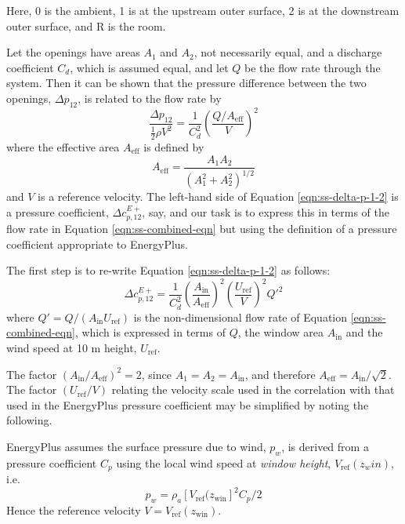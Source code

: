 Here, 0 is the  ambient, 1 is at the upstream outer surface, 2 is at the downstream outer surface, and R is the room.

Let the openings have areas $A_1$ and $A_2$, not necessarily equal, and a discharge coefficient $C_d$, which is assumed equal, and let $Q$ be the flow rate through the system. Then it can be shown that the pressure difference between the two openings, $\Delta p_{12}$, is related to the flow rate by
\begin{equation}\label{eqn:ss-delta-p-1-2}
\frac{\Delta p_{12}}{\frac{1}{2}\rho V^2} = \frac{1}{C_d^2}\left(\frac{Q/A_\text{eff}}{V}\right)^2
\end{equation}
where the effective area $A_\text{eff}$ is defined by
\begin{equation}
A_\text{eff}=\frac{A_1 A_2}{\left(A_1^2+A_2^2\right)^{1/2}}
\end{equation}
and $V$ is a reference velocity. The left-hand side of Equation \ref{eqn:ss-delta-p-1-2} is a pressure coefficient, $\Delta c_{p,12}^{E+}$, say, and our task is to express this in terms of the flow rate in Equation \ref{eqn:ss-combined-eqn} but using the definition of a pressure coefficient appropriate to EnergyPlus.

The first step is to re-write Equation \ref{eqn:ss-delta-p-1-2} as follows:
\begin{equation}
\Delta c_{p,12}^{E+} = \frac{1}{C_d^2}  \left(\frac{A_\text{in}}{A_\text{eff}}\right)^2 \left(\frac{U_\text{ref}}{V}\right)^2 Q'^2
\end{equation}
where $Q' = Q/(A_\text{in}U_\text{ref})$ is the non-dimensional flow rate of Equation \ref{eqn:ss-combined-eqn}, which is expressed in terms of $Q$, the window area $A_\text{in}$ and the wind speed at 10 m height, $U_\text{ref}$.

The factor $\left(A_\text{in}/A_\text{eff}\right)^2 = 2$, since $A_1 = A_2 = A_\text{in}$, and therefore $A_\text{eff} = A_\text{in}/\sqrt{2}$. The factor $(U_\text{ref}/V)$ relating the velocity scale used in the correlation with that used in the EnergyPlus pressure coefficient may be simplified by noting the following.

EnergyPlus assumes the surface pressure due to wind, $p_w$, is derived from a pressure
coefficient $C_p$ using the local wind speed at \textit{window height}, $V_\text{ref}(z_win)$,
i.e.
\begin{equation}
p_w=\rho_a \left[V_\text{ref}(z_\text{win}\right]^2 C_p/2
\end{equation}
Hence the reference velocity $V =  V_\text{ref}(z_\text{win})$.

